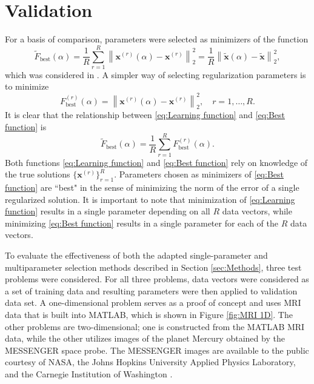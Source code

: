 \documentclass[12pt]{article}
\newcommand{\xVec}{\mathbf{x}}	%
\newcommand{\regparam}{\alpha}  %
\newcommand{\xBig}{\widetilde{\xVec}}	%
\begin{document}
\section{Validation} \label{sec:Validation}
For a basis of comparison, parameters were selected as minimizers of the function
\begin{equation}
\label{eq:Learning function}
\widetilde{F}_{\text{best}}(\regparam) = \frac{1}{R}\sum_{r=1}^R \left\|\xVec^{(r)}(\regparam) - \xVec^{(r)}\right\|_2^2 = \frac{1}{R}\left\|\xBig(\regparam) - \xBig\right\|_2^2,
\end{equation} 
which was considered in \cite{ChungEspanol2017}. A simpler way of selecting regularization parameters is to minimize
\begin{equation}
\label{eq:Best function}
F_{\text{best}}^{(r)}(\regparam) = \left\|\xVec^{(r)}(\regparam) - \xVec^{(r)}\right\|_2^2, \quad r = 1,\ldots,R.
\end{equation}
It is clear that the relationship between \eqref{eq:Learning function} and \eqref{eq:Best function} is
\[\widetilde{F}_{\text{best}}(\regparam) = \frac{1}{R}\sum_{r=1}^R F_{\text{best}}^{(r)}(\regparam).\]
Both functions \eqref{eq:Learning function} and \eqref{eq:Best function} rely on knowledge of the true solutions $\{\xVec^{(r)}\}_{r=1}^R$. Parameters chosen as minimizers of \eqref{eq:Best function} are ``best" in the sense of minimizing the norm of the error of a single regularized solution. It is important to note that minimization of \eqref{eq:Learning function} results in a single parameter depending on all $R$ data vectors, while minimizing \eqref{eq:Best function} results in a single parameter for each of the $R$ data vectors. \par
To evaluate the effectiveness of both the adapted single-parameter and multiparameter selection methods described in Section \ref{sec:Methods}, three test problems were considered. For all three problems, data vectors were considered as a set of training data and resulting parameters were then applied to validation data set. A one-dimensional problem serves as a proof of concept and uses MRI data that is built into MATLAB, which is shown in Figure \ref{fig:MRI 1D}. The other problems are two-dimensional; one is constructed from the MATLAB MRI data, while the other utilizes images of the planet Mercury obtained by the MESSENGER space probe. The MESSENGER images are available to the public courtesy of NASA, the Johns Hopkins University Applied Physics Laboratory, and the Carnegie Institution of Washington \cite{MESSENGER}. \par
\end{document}
